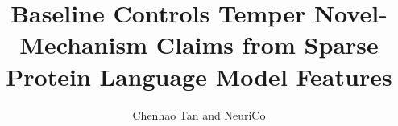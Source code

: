 \documentclass{article}
\title{Baseline Controls Temper Novel-Mechanism Claims from Sparse Protein Language Model Features}
\author{Chenhao Tan and NeuriCo}
\begin{document}
\maketitle

\begin{abstract}

\end{abstract}









\end{document}
